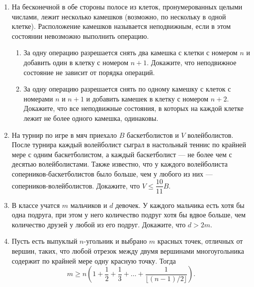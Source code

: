 \documentclass{article}
\begin{document}
\begin{enumerate}[label*=\protect\fbox{\arabic{enumi}}]
\item На бесконечной в обе стороны полосе из клеток, пронумерованных целыми числами, лежит несколько камешков (возможно, по нескольку в одной клетке). Расположение камешков называется неподвижным, если в этом состоянии невозможно выполнить операцию.
\begin{enumerate} 
	\item За одну операцию разрешается снять два камешка с клетки с номером $n$ и добавить один в клетку с номером $n + 1$. Докажите, что неподвижное состояние не зависит от порядка операций.
	\item За одну операцию разрешается снять по одному камешку с клеток с номерами $ n $ и $ n + 1 $ и добавить камешек в клетку с номером $ n + 2 $. Докажите, что все неподвижные состояния, в которых на каждой клетке лежит не более одного камешка, одинаковы.
\end{enumerate} 
\item На турнир по игре в мяч приехало $ B $ баскетболистов и $ V $ волейболистов. После турнира каждый волейболист сыграл в настольный теннис по крайней мере с одним баскетболистом, а каждый баскетболист — не более чем с десятью волейболистами. Также известно, что у каждого волейболиста соперников-баскетболистов было больше, чем у любого из них — соперников-волейболистов. Докажите, что $ V \leqslant \dfrac{10}{11} B $.

\item В классе учатся $ m $ мальчиков и $ d $ девочек. У каждого мальчика есть хотя бы одна подруга, при этом у него количество подруг хотя бы вдвое больше, чем количество друзей у любой из его подруг. Докажите, что $ d > 2m $.

\item Пусть есть выпуклый $ n $-угольник и выбрано $ m $ красных точек, отличных от вершин, таких, что любой отрезок между двумя вершинами многоугольника содержит по крайней мере одну красную точку. Тогда
$$ m\geqslant n \left(1+\dfrac{1}{2}+\dfrac{1}{3}+\dotsc+\dfrac{1}{\lfloor (n-1)/2\rfloor}\right). $$


\end{enumerate}
\end{document}
